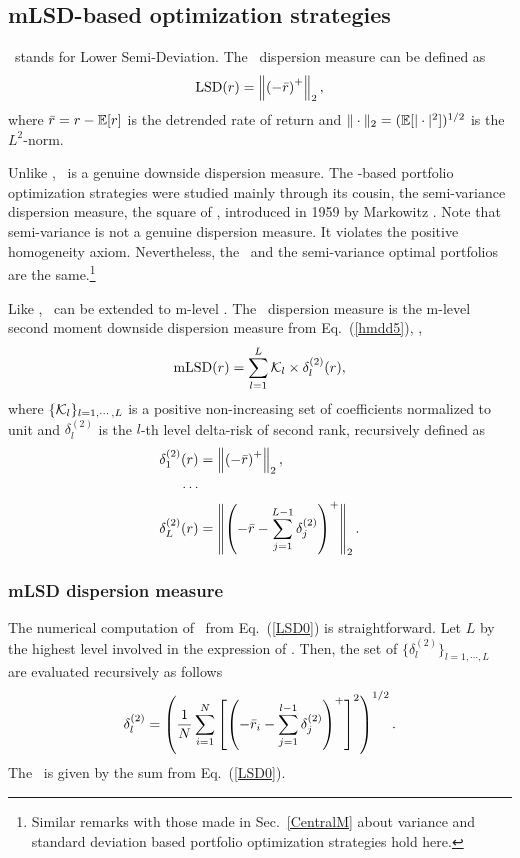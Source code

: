 
\subsection{mLSD-based optimization strategies}\label{S:mLSD}

\LSD\ stands for Lower Semi-Deviation. The \LSD\ dispersion measure can be defined as
\begin{equation}
    \LSD(r) = \left\| \left(-\br \right)^+ \right\|_2,
    \label{LSD:1}
\end{equation}
where ${\bar r} = r - {\mathbb E}[r]$ is the detrended rate of return and $\|\cdot\|_2 = ({\mathbb E}[|\cdot|^2])^{1/2}$ is the $L^2$-norm.

Unlike \MAD, \LSD\ is a genuine downside dispersion measure.
The \LSD-based portfolio optimization strategies were studied mainly through its
cousin, the semi-variance dispersion measure, the square of \LSD, introduced in 1959 by Markowitz \cite{Markowitz2}.
Note that semi-variance is not a genuine dispersion measure. It violates the
positive homogeneity axiom.
Nevertheless, the \LSD\ and the semi-variance optimal portfolios are the same.\footnote{Similar remarks with those made in
Sec.~\ref{CentralM} about variance and standard deviation based portfolio optimization strategies hold here.}

Like \MAD, \LSD\ can be extended to m-level \LSD. The \mLSD\ dispersion measure
is the m-level second moment downside dispersion measure from Eq.~(\ref{hmdd5}), \ie,
\begin{equation}
    \mLSD(r) = \sum_{l=1}^L \cK_l \times \delta^{(2)}_l(r),
    \label{LSD0}
\end{equation}
where $\{{\cal K}_l\}_{l=1,\cdots,L}$ is a positive non-increasing set of coefficients normalized to unit and
$\delta^{(2)}_l$ is the $l$-th level delta-risk of second rank,
recursively defined as
\begin{align}
    \delta^{(2)}_1(r) &= \left\| \left(-\br \right)^+ \right\|_2, \label{LSD02} \\
    \cdots & \noindent \\
    \delta^{(2)}_L(r) &= \left\| \left(-\br - \sum_{j=1}^{L-1} \delta^{(2)}_j \right)^+ \right\|_2. \label{LSD01}
\end{align}


\BackToContents


\subsubsection{mLSD dispersion measure}
The numerical computation of \mLSD\ from Eq.~(\ref{LSD0}) is straightforward.
Let $L$ by the highest level involved in the expression of \mLSD. Then,
the set of $\{\delta^{(2)}_l\}_{l=1,\cdots,L}$ are evaluated recursively as follows
\begin{equation}
    \delta^{(2)}_l = \left(\frac{1}{N}\sum_{i=1}^N \left[\left( -\br_i -\sum_{j=1}^{l-1} \delta^{(2)}_j \right)^+\right]^2 \right)^{1/2}.
    \label{LSD1}
\end{equation}
The \mLSD\ is given by the sum from Eq.~(\ref{LSD0}).


